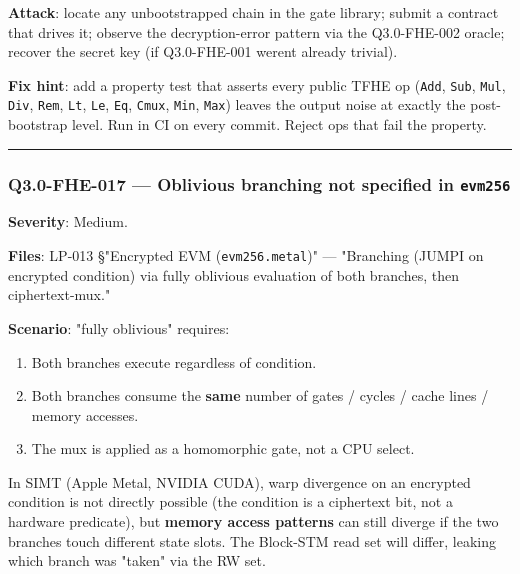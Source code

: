 \documentclass[
]{article}
\providecommand{\tightlist}{%
  \setlength{\itemsep}{0pt}\setlength{\parskip}{0pt}}
\begin{document}
\textbf{Attack}: locate any unbootstrapped chain in the gate library;
submit a contract that drives it; observe the decryption-error pattern
via the Q3.0-FHE-002 oracle; recover the secret key (if Q3.0-FHE-001
weren\textquotesingle t already trivial).

\textbf{Fix hint}: add a property test that asserts every public TFHE op
(\texttt{Add}, \texttt{Sub}, \texttt{Mul}, \texttt{Div}, \texttt{Rem},
\texttt{Lt}, \texttt{Le}, \texttt{Eq}, \texttt{Cmux}, \texttt{Min},
\texttt{Max}) leaves the output noise at exactly the post-bootstrap
level. Run in CI on every commit. Reject ops that fail the property.

\begin{center}\rule{0.5\linewidth}{0.5pt}\end{center}

\subsubsection{\texorpdfstring{Q3.0-FHE-017 --- Oblivious branching not
specified in
\texttt{evm256}}{Q3.0-FHE-017 --- Oblivious branching not specified in evm256}}\label{q30-fhe-017--oblivious-branching-not-specified-in-evm256}

\textbf{Severity}: Medium.

\textbf{Files}: LP-013 §"Encrypted EVM (\texttt{evm256.metal})" ---
"Branching (JUMPI on encrypted condition) via fully oblivious evaluation
of both branches, then ciphertext-mux."

\textbf{Scenario}: "fully oblivious" requires:

\begin{enumerate}
\def\labelenumi{\arabic{enumi}.}
\tightlist
\item
  Both branches execute regardless of condition.
\item
  Both branches consume the \textbf{same} number of gates / cycles /
  cache lines / memory accesses.
\item
  The mux is applied as a homomorphic gate, not a CPU select.
\end{enumerate}

In SIMT (Apple Metal, NVIDIA CUDA), warp divergence on an encrypted
condition is not directly possible (the condition is a ciphertext bit,
not a hardware predicate), but \textbf{memory access patterns} can still
diverge if the two branches touch different state slots. The Block-STM
read set will differ, leaking which branch was "taken" via the RW set.
\end{document}
